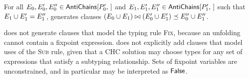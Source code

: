 For all $E_0, E_0', E_0'' \in \antichains{ P_0' }$ and %
$E_1, E_1', E_1'' \in \antichains{ P_1' }$ such that $E_1 \cup E_1'
= E_1''$, \verifybnd generates clauses $(E_0 \cup E_1) \bowtie
(E_0' \cup E_1') \preceq E_0'' \cup E_1''$.


\verifybnd does not generate clauses that model the typing rule
\textsc{Fix}, because an unfolding cannot contain a fixpoint
expression.
%
\verifybnd does not explicitly add clauses that model uses of the
\textsc{Sub} rule, given that a CHC solution may choose types for any
set of expressions that satisfy a subtyping relationship.
%
Sets of fixpoint variables are unconstrained, and in particular may be
interpreted as $\mathsf{False}$.

